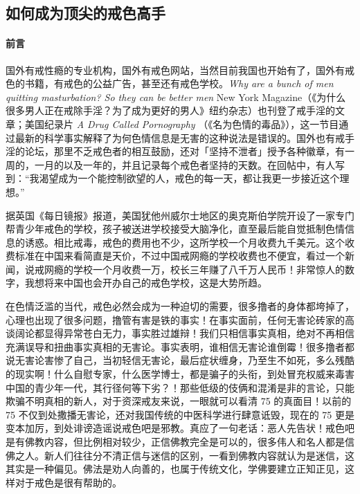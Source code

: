 \subsection{如何成为顶尖的戒色高手}

\paragraph*{前言}

国外有戒性瘾的专业机构，国外有戒色网站，当然目前我国也开始有了，国外有戒色的书籍，有戒色的公益广告，甚至还有戒色学校。\textit{Why are a bunch of men quitting masturbation? So they can be better men} New York Magazine（《为什么很多男人正在戒除手淫？为了成为更好的男人》纽约杂志）也刊登了戒手淫的文章；美国纪录片 \textit{A Drug Called Pornography} （《名为色情的毒品》），这一节目通过最新的科学事实解释了为何色情信息是无害的这种说法是错误的。国外也有戒手淫的论坛，那里不乏戒色者的相互鼓励，还对「坚持不泄者」授予各种徽章，有一周的，一月的以及一年的，并且记录每个戒色者坚持的天数。在回帖中，有人写到：“我渴望成为一个能控制欲望的人，戒色的每一天，都让我更一步接近这个理想。”

据英国《每日镜报》报道，美国犹他州威尔士地区的奥克斯伯学院开设了一家专门帮青少年戒色的学校，孩子被送进学校接受大脑净化，直至最后能自觉抵制色情信息的诱惑。相比戒毒，戒色的费用也不少，这所学校一个月收费九千美元。这个收费标准在中国来看简直是天价，不过中国戒网瘾的学校收费也不便宜，看过一个新闻，说戒网瘾的学校一个月收费一万，校长三年赚了八千万人民币！非常惊人的数字，我想将来中国也会开办自己的戒色学校，这是大势所趋。

在色情泛滥的当代，戒色必然会成为一种迫切的需要，很多撸者的身体都垮掉了，心理也出现了很多问题，撸管有害是铁的事实！在事实面前，任何无害论砖家的高谈阔论都显得异常苍白无力，事实胜过雄辩！我们只相信事实真相，绝对不再相信充满误导和扭曲事实真相的无害论。事实表明，谁相信无害论谁倒霉！很多撸者都说无害论害惨了自己，当初轻信无害论，最后症状缠身，乃至生不如死，多么残酷的现实啊！什么自慰专家，什么医学博士，都是骗子的头衔，到处冒充权威来毒害中国的青少年一代，其行径何等下劣？！那些低级的伎俩和混淆是非的言论，只能欺骗不明真相的新人，对于资深戒友来说，一眼就可以看清 75 的真面目！以前的 75 不仅到处撒播无害论，还对我国传统的中医科学进行肆意诋毁，现在的 75 更是变本加厉，到处诽谤造谣说戒色吧是邪教。真应了一句老话：恶人先告状！戒色吧是有佛教内容，但比例相对较少，正信佛教完全是可以的，很多伟人和名人都是信佛之人。新人们往往分不清正信与迷信的区别，一看到佛教内容就认为是迷信，这其实是一种偏见。佛法是劝人向善的，也属于传统文化，学佛要建立正知正见，这样对于戒色是很有帮助的。

